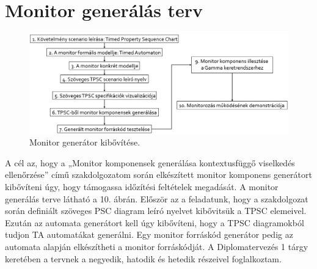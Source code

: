 \chapter{Monitor generálás terv}

\begin{figure}[!ht]
    \centering
    \includegraphics[width=150mm, keepaspectratio]{figures/generation_plan.png}
    \caption{Monitor generátor kibővítése.}
\end{figure}

A cél az, hogy a „Monitor komponensek generálása kontextusfüggő viselkedés ellenőrzése” című szakdolgozatom során elkészített monitor komponens generátort kibővíteni úgy, hogy támogassa időzítési feltételek megadását. A monitor generálás terve látható a 10. ábrán. Először az a feladatunk, hogy a szakdolgozat során definiált szöveges PSC diagram leíró nyelvet kibővitsük a TPSC elemeivel. Ezután az automata generátort kell úgy kibővíteni, hogy a TPSC diagramokból tudjon TA automatákat generálni. Egy monitor forráskód generátor pedig az automata alapján elkészítheti a monitor forráskódját. A Diplomatervezés 1 tárgy keretében a tervnek a negyedik, hatodik és hetedik részeivel foglalkoztam.